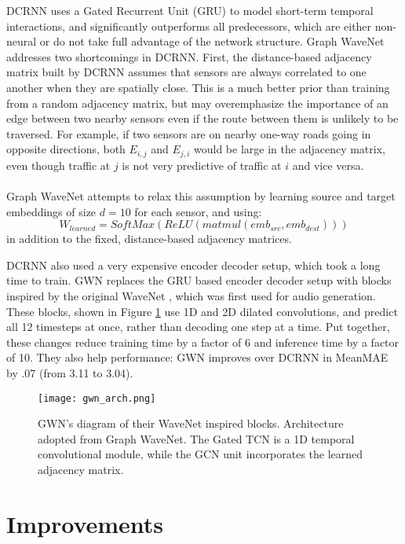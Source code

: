 \documentclass[10pt]{article}
\begin{document}
DCRNN uses a Gated Recurrent Unit (GRU) to model short-term temporal interactions, and significantly outperforms all predecessors, which are either non-neural or do not take full advantage of the network structure.
Graph WaveNet \citep{gwn} addresses two shortcomings in DCRNN.
First, the distance-based adjacency matrix built by DCRNN assumes that sensors are always correlated to one another when they are spatially close. This is a much better prior than training from a random adjacency matrix, but may overemphasize the importance of an edge between two nearby sensors even if the route between them is unlikely to be traversed. For example, if two sensors are on nearby one-way roads going in opposite directions, both $E_{i,j}$ and $E_{j,i}$ would be large in the adjacency matrix, even though traffic at $j$ is not very predictive of traffic at $i$ and vice versa.\\\\
Graph WaveNet \citep{gwn} attempts to relax this assumption by learning source and target embeddings of size $d=10$ for each sensor, and using:\\
\[ W_{learned} = SoftMax(ReLU(matmul(emb_{src}, emb_{dest}))) \]
\newline in addition to the fixed, distance-based adjacency matrices.

DCRNN also used a very expensive encoder decoder setup, which took a long time to train. GWN replaces the GRU based encoder decoder setup with blocks inspired by the original WaveNet \citep{WaveNet}, which was first used for audio generation. These blocks, shown in Figure \ref{gwn_architecture} use 1D and 2D dilated convolutions, and predict all 12 timesteps at once, rather than decoding one step at a time. Put together, these changes reduce training time by a factor of 6 and inference time by a factor of 10. They also help performance: GWN improves over DCRNN in MeanMAE by .07 (from 3.11 to 3.04).

\begin{figure}[H]
\centering
    \texttt{[image: gwn\_arch.png]}
    \caption{GWN's diagram of their WaveNet inspired blocks. Architecture adopted from Graph WaveNet. The Gated TCN is a 1D temporal convolutional module, while the GCN unit incorporates the learned adjacency matrix.
    }
    \label{gwn_architecture}
\end{figure}

\section{Improvements}
\end{document}
